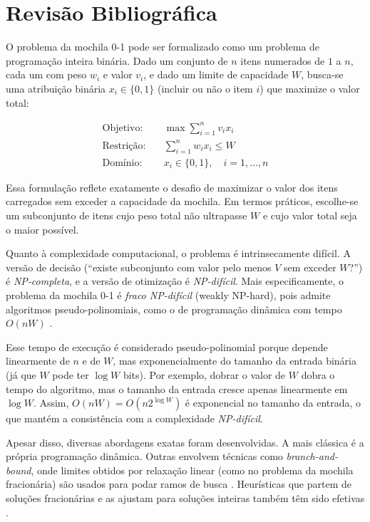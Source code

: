 \section{Revisão Bibliográfica}

O problema da mochila 0-1 pode ser formalizado como um problema de programação inteira binária. Dado um conjunto de $n$ itens numerados de $1$ a $n$, cada um com peso $w_i$ e valor $v_i$, e dado um limite de capacidade $W$, busca-se uma atribuição binária $x_i \in \{0,1\}$ (incluir ou não o item $i$) que maximize o valor total:

\begin{align*}
\text{Objetivo:} &\quad \max \sum_{i=1}^n v_i x_i \\
\text{Restrição:} &\quad \sum_{i=1}^n w_i x_i \le W \\
\text{Domínio:} &\quad x_i \in \{0,1\},\quad i=1,\dots,n
\end{align*}

Essa formulação reflete exatamente o desafio de maximizar o valor dos itens carregados sem exceder a capacidade da mochila. Em termos práticos, escolhe-se um subconjunto de itens cujo peso total não ultrapasse $W$ e cujo valor total seja o maior possível.

Quanto à complexidade computacional, o problema é intrinsecamente difícil. A versão de decisão (``existe subconjunto com valor pelo menos $V$ sem exceder $W$?'') é \textit{NP-completa}, e a versão de otimização é \textit{NP-difícil}. Mais especificamente, o problema da mochila 0-1 é \textit{fraco NP-difícil} (weakly NP-hard), pois admite algoritmos pseudo-polinomiais, como o de programação dinâmica com tempo $O(nW)$ \cite{pisinger2005}.

Esse tempo de execução é considerado pseudo-polinomial porque depende linearmente de $n$ e de $W$, mas exponencialmente do tamanho da entrada binária (já que $W$ pode ter $\log W$ bits). Por exemplo, dobrar o valor de $W$ dobra o tempo do algoritmo, mas o tamanho da entrada cresce apenas linearmente em $\log W$. Assim, $O(nW) = O(n2^{\log W})$ é exponencial no tamanho da entrada, o que mantém a consistência com a complexidade \textit{NP-difícil}.

Apesar disso, diversas abordagens exatas foram desenvolvidas. A mais clássica é a própria programação dinâmica. Outras envolvem técnicas como \textit{branch-and-bound}, onde limites obtidos por relaxação linear (como no problema da mochila fracionária) são usados para podar ramos de busca \cite{martello1990}. Heurísticas que partem de soluções fracionárias e as ajustam para soluções inteiras também têm sido efetivas \cite{pisinger2005}.

